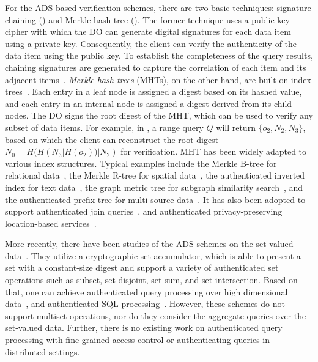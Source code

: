 For the ADS-based verification schemes, there are two basic techniques: signature chaining () and Merkle hash tree (). The former technique uses a public-key cipher with which the DO can generate digital signatures for each data item using a private key. Consequently, the client can verify the authenticity of the data item using the public key. To establish the completeness of the query results, chaining signatures are generated to capture the correlation of each item and its adjacent items~\cite{10.1109/ICDE.2004.1320027}. \emph{Merkle hash trees} (MHTs), on the other hand, are built on index trees~\cite{10.1007/0-387-34805-0_21}. Each entry in a leaf node is assigned a digest based on its hashed value, and each entry in an internal node is assigned a digest derived from its child nodes. The DO signs the root digest of the MHT, which can be used to verify any subset of data items. For example, in , a range query $Q$ will return $\{o_2, N_2, N_3\}$, based on which the client can reconstruct the root digest $N_0 = H( H(N_3 | H(o_2))| N_2)$ for verification. MHT has been widely adapted to various index structures. Typical examples include the Merkle B-tree for relational data~\cite{10.1145/1142473.1142488}, the Merkle R-tree for spatial data~\cite{10.1007/s00778-008-0113-2,10.1109/icde.2011.5767829}, the authenticated inverted index for text data~\cite{10.14778/1453856.1453875}, the graph metric tree for subgraph similarity search~\cite{10.1109/tkde.2014.2316818}, and the authenticated prefix tree for multi-source data~\cite{10.1145/2723372.2747649}. It has also been adopted to support authenticated join queries~\cite{10.1145/1559845.1559849}, and authenticated privacy-preserving location-based services~\cite{10.1145/2213836.2213871,10.1109/icde.2013.6544932,10.14778/2732219.2732224}.

More recently, there have been studies of the ADS schemes on the set-valued data~\cite{10.1007/978-3-642-22792-9_6,10.1007/978-3-642-54631-0_7,10.1109/eurosp.2017.35}. They utilize a cryptographic set accumulator, which is able to present a set with a constant-size digest and support a variety of authenticated set operations such as subset, set disjoint, set sum, and set intersection. Based on that, one can achieve authenticated query processing over high dimensional data~\cite{10.1145/2660267.2660373}, and authenticated SQL processing~\cite{10.1145/2810103.2813711}. However, these schemes do not support multiset operations, nor do they consider the aggregate queries over the set-valued data. Further, there is no existing work on authenticated query processing with fine-grained access control or authenticating queries in distributed settings. %

